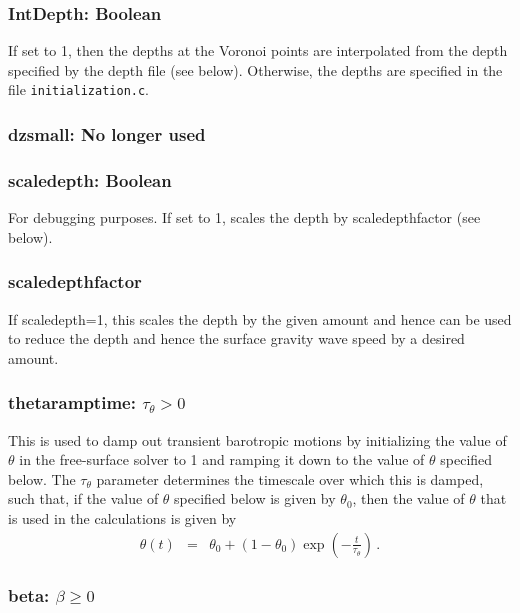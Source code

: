 \documentclass[12pt,oneside]{article}
\begin{document}
\subsubsection{IntDepth: Boolean}

If set to 1, then the depths at the Voronoi points are interpolated from the
depth specified by the depth file (see below).  Otherwise, the depths are
specified in the file \verb+initialization.c+.

\subsubsection{dzsmall: No longer used}

\subsubsection{scaledepth: Boolean}

For debugging purposes.  If set to 1, scales the depth by scaledepthfactor (see below).

\subsubsection{scaledepthfactor}

If scaledepth=1, this scales the depth by the given amount and hence
can be used to reduce the depth and hence the surface gravity wave speed by
a desired amount.

\subsubsection{thetaramptime: $\tau_\theta >0$}

This is used to damp out transient barotropic motions by initializing
the value of $\theta$ in the free-surface solver to 1 and ramping it
down to the value of $\theta$ specified below.  The $\tau_\theta$ parameter
determines the timescale over which this is damped, such that, if the value
of $\theta$ specified below is given by $\theta_0$, then the value of
$\theta$ that is used in the calculations is given by
\begin{eqnarray}
\theta(t) &=& \theta_0 + (1-\theta_0)\exp\left(-\frac{t}{\tau_\theta}\right)\nonumber\,.
\end{eqnarray}

\subsubsection{beta: $\beta\ge 0$}
\end{document}
